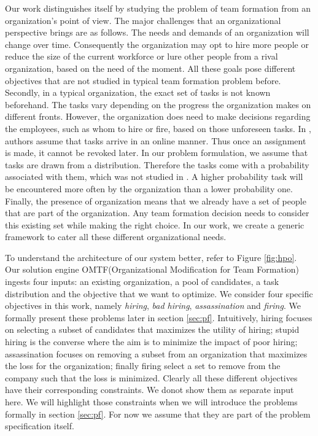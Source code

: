 Our work distinguishes itself by studying the problem of team formation from an organization's point of view. The major challenges that an organizational perspective brings are as follows. The needs and demands of an organization will change over time. Consequently the organization may opt to hire more people or reduce the size of the current workforce or lure other people from a rival organization, based on the need of the moment. All these goals pose different objectives that are not studied in typical team formation problem before. Secondly, in a typical organization, the exact set of tasks is not known beforehand. The tasks vary depending on the progress the organization makes on different fronts. However, the organization does need to make decisions regarding the employees, such as whom to hire or fire, based on those unforeseen tasks. In \cite{anagnostopoulos2012online}, authors assume that tasks arrive in an online manner. Thus once an assignment is made, it cannot be revoked later. In our problem formulation, we assume that tasks are drawn from a distribution. Therefore the tasks come with a probability associated with them, which was not studied in \cite{anagnostopoulos2012online}. A higher probability task will be encountered more often by the organization than a lower probability one. Finally, the presence of organization means that we already have a set of people that are part of the organization. Any team formation decision needs to consider this existing set while making the right choice. In our work, we create a generic framework to cater all these different organizational needs.

To understand the architecture of our system better, refer to Figure \ref{fig:hpo}. Our solution engine OMTF(Organizational Modification for Team Formation) ingests four inputs: an existing organization, a pool of candidates, a task distribution and the objective that we want to optimize. We consider four specific objectives in this work, namely \textit{hiring}, \textit{bad hiring}, \textit{assassination} and \textit{firing}. We formally present these problems later in section \ref{sec:pf}. Intuitively, hiring focuses on selecting a subset of candidates that maximizes the utility of hiring; stupid hiring is the converse where the aim is to minimize the impact of poor hiring; assassination focuses on removing a subset from an organization that maximizes the loss for the organization; finally firing select a set to remove from the company such that the loss is minimized. Clearly all these different objectives have their corresponding constraints. We donot show them as separate input here. We will highlight those constraints when we will introduce the problems formally in section \ref{sec:pf}.  For now we assume that they are part of the problem specification itself.

